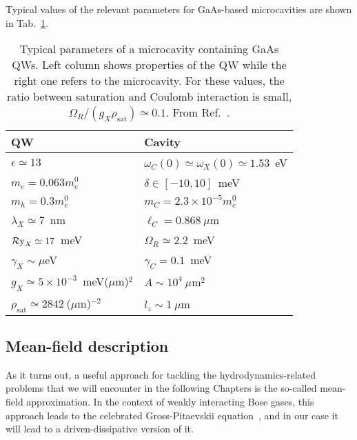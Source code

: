 Typical values of the relevant parameters for GaAs-based
microcavities are shown in Tab.~\ref{tab:GaAs-params}. 
%
\begin{table}
  \centering
  \begin{tabular}{@{}ll@{}} \toprule
    QW & Cavity \\ \midrule
    $\epsilon \simeq 13$ &  $\omega_C(0) \simeq \omega_X(0) \simeq 1.53$~eV\\
    $m_e = 0.063m^0_e$    &  $\delta \in [-10,10]$~meV\\
    $m_h = 0.3m^0_e$      &  $m_{C} = 2.3\times 10^{-5} m^0_e$ \\
    $\lambda_X \simeq 7$~nm   & $\ell_{C} = 0.868~\mu$m\\
    $\operatorname{\mathcal{R}y}_X \simeq 17$~meV &  $\Omega_R \simeq 2.2$~meV \\
    $\gamma_X \sim \mu$eV &  $\gamma_C = 0.1$~meV \\ 
    $g_X \simeq 5\times10^{-3}$~meV($\mu$m)$^2$ &  $A \sim 10^4~\mu$m$^2$\\
    $\rho_{\text{sat}} \simeq 2842~$($\mu$m)$^{-2}$ &  $l_z \sim 1~\mu$m\\ \bottomrule
  \end{tabular}
  \caption{Typical parameters of a microcavity containing GaAs QWs. Left column shows properties of the QW while the right one refers to the microcavity. For these values, the ratio between saturation and
    Coulomb interaction is small,
    $\Omega_R/(g_X \rho_{\text{sat}}) \simeq 0.1$. From Ref.~\cite{9783642241857}.}
  \label{tab:GaAs-params}
\end{table}
%


\subsection{Mean-field description}
\label{subsec:mean-field}

As it turns out, a useful approach for tackling the
hydrodynamics-related problems that we will encounter in the following
Chapters is the so-called mean-field approximation. In the context of
weakly interacting Bose gases, this approach leads to the celebrated
Gross-Pitaevskii equation~\cite{9780198507192}, and in our case it
will lead to a driven-dissipative version of it.

